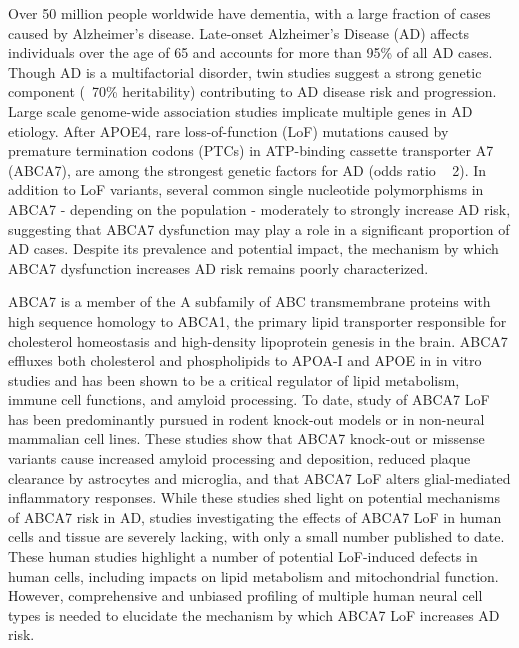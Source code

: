 Over 50 million people worldwide have dementia, with a large fraction of cases caused by Alzheimer’s disease\cite{Alzheimers_Disease_International2020-xv}. Late-onset Alzheimer’s Disease (AD) affects individuals over the age of 65 and accounts for more than 95\% of all AD cases\cite{Alzheimers_Association2016-vq}. Though AD is a multifactorial disorder, twin studies suggest a strong genetic component (~70\% heritability)\cite{Karlsson2022-vv} contributing to AD disease risk and progression. Large scale genome-wide association studies implicate multiple genes in AD etiology\cite{Lambert2013-km,Marioni2019-os,Jansen2019-ww,Kunkle2019-yo,De_Rojas2021-gu,Wightman2021-km,Bellenguez2022-ao,Belloy2023-kj}. After APOE4, rare loss-of-function (LoF) mutations caused by premature termination codons (PTCs) in ATP-binding cassette transporter A7 (ABCA7), are among the strongest genetic factors for AD (odds ratio ~ 2)\cite{Steinberg2015-mu,De_Roeck2019-te,Reitz2013-eo,Bellenguez2022-ao,Holstege2022-vp,Lyssenko2021-gw}. In addition to LoF variants, several common single nucleotide polymorphisms in ABCA7 - depending on the population - moderately\cite{Steinberg2015-mu,De_Roeck2019-te,Reitz2013-eo,Bellenguez2022-ao,Le_Guennec2016-nl,Hollingworth2011-tr,Naj2011-bs} to strongly\cite{Reitz2013-eo} increase AD risk, suggesting that ABCA7 dysfunction may play a role in a significant proportion of AD cases. Despite its prevalence and potential impact, the mechanism by which ABCA7 dysfunction increases AD risk remains poorly characterized. 

ABCA7 is a member of the A subfamily of ABC transmembrane proteins\cite{Kim2008-zi} with high sequence homology to ABCA1, the primary lipid transporter responsible for cholesterol homeostasis and high-density lipoprotein genesis in the brain\cite{Koldamova2014-kd}. ABCA7 effluxes both cholesterol and phospholipids to APOA-I and APOE in in vitro studies\cite{Abe-Dohmae2004-wb,Wang2003-wh,Tomioka2017-nv,Picataggi2022-yp,Quazi2013-pe,Fang2025} and has been shown to be a critical regulator of lipid metabolism, immune cell functions, and amyloid processing\cite{Aikawa2018-ek,Tanaka2011-zo,Duchateau2023-ji,Kawatani2023-vf,Tayran2024-bo}. To date, study of ABCA7 LoF has been predominantly pursued in rodent knock-out models or in non-neural mammalian cell lines. These studies show that ABCA7 knock-out or missense variants  cause increased amyloid processing and deposition\cite{Satoh2015-yu,Sakae2016-uy,Chan2008-qu,Bamji-Mirza2018-xt}, reduced plaque clearance by astrocytes and microglia\cite{Kim2013-sv,Fu2016-qe}, and that ABCA7 LoF alters glial-mediated inflammatory responses\cite{Aikawa2019-hv,Aikawa2021-vz}.  While these studies shed light on potential mechanisms of ABCA7 risk in AD, studies investigating the effects of ABCA7 LoF in human cells and tissue are severely lacking, with only a small number published to date\cite{Kawatani2023-vf,Allen2017-vw,Liu2021-zh,Bamji-Mirza2018-xt}.  These human studies highlight a number of potential LoF-induced defects in human cells, including impacts on lipid metabolism and mitochondrial function\cite{Kawatani2023-vf}. However, comprehensive and unbiased profiling of multiple human neural cell types is needed to elucidate the mechanism by which ABCA7 LoF increases AD risk.

